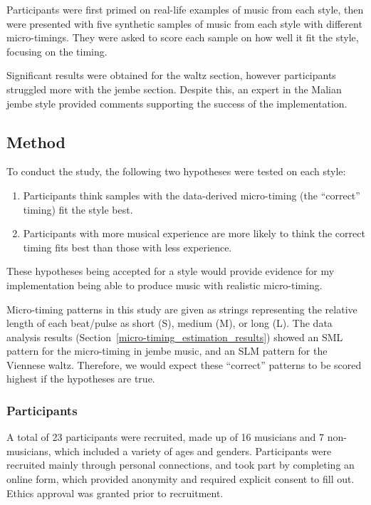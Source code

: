 \documentclass[12pt,twoside,openright]{report}
\begin{document}
Participants were first primed on real-life
examples of music from each style, then were presented with five synthetic
samples of music from each style with different micro-timings. They were asked
to score each sample on how well it fit the style, focusing on the timing.

Significant results were obtained for the waltz section, however participants
struggled more with the jembe section. Despite this, an expert in the Malian
jembe style provided comments supporting the success of the implementation.


\subsection{Method} \label{user_study_method}

To conduct the study, the following two hypotheses were tested on each style:

\begin{enumerate}
    \item \label{hypothesis_1} Participants think samples with the data-derived micro-timing (the ``correct'' timing) fit the style best.
    \item \label{hypothesis_2} Participants with more musical experience are more likely to think the correct timing fits best than those with less experience.
\end{enumerate}

These hypotheses being accepted for a style would provide evidence for my
implementation being able to produce music with realistic micro-timing.

Micro-timing patterns in this study are given as strings representing the
relative length of each beat/pulse as short (S), medium (M), or long (L). The
data analysis results (Section~\ref{micro-timing_estimation_results}) showed an SML pattern for the micro-timing in
jembe music, and an SLM pattern for the Viennese waltz. Therefore, we would
expect these ``correct'' patterns to be scored highest if the hypotheses are
true.

\subsubsection{Participants} \label{participants}

A total of 23 participants were recruited, made up of 16 musicians and 7
non-musicians, which included a variety of ages and genders. Participants were
recruited mainly through personal connections, and took part by completing an
online form, which provided anonymity and required explicit consent to fill out.
Ethics approval was granted prior to recruitment.
\end{document}
